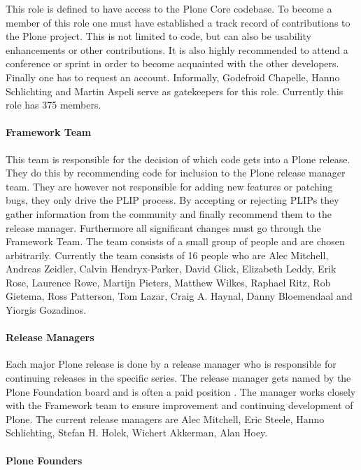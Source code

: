 This role is defined to have access to the Plone Core codebase. To become a
member of this role one must have established a track record of contributions
to the Plone project. This is not limited to code, but can also be usability
enhancements or other contributions. It is also highly recommended to attend a
conference or sprint in order to become acquainted with the other developers.
Finally one has to request an account. Informally, Godefroid Chapelle, Hanno
Schlichting and Martin Aspeli serve as gatekeepers for this role. Currently
this role has 375 members.

\paragraph{Framework Team}

This team is responsible for the decision of which code gets into a Plone
release. They do this by recommending code for inclusion to the Plone release
manager team. They are however not responsible for adding new features or
patching bugs, they only drive the \ac{PLIP} process. By accepting or rejecting
\acp{PLIP} they gather information from the community and finally recommend
them to the release manager. Furthermore all significant changes must go
through the Framework Team. The team consists of a small group of people and
are chosen arbitrarily. Currently the team consists of 16 people who are Alec
Mitchell, Andreas Zeidler, Calvin Hendryx-Parker, David Glick, Elizabeth Leddy,
Erik Rose, Laurence Rowe, Martijn Pieters, Matthew Wilkes, Raphael Ritz, Rob
Gietema, Ross Patterson, Tom Lazar, Craig A. Haynal, Danny Bloemendaal and
Yiorgis Gozadinos.

\paragraph{Release Managers}

Each major Plone release is done by a release manager who is responsible for
continuing releases in the specific series. The release manager gets named by
the Plone Foundation board and is often a paid position
\cite{PlonePaidReleaseManager}. The manager works closely with the Framework
team to ensure improvement and continuing development of Plone. The current
release managers are Alec Mitchell, Eric Steele, Hanno Schlichting, Stefan H.
Holek, Wichert Akkerman, Alan Hoey.

\paragraph{Plone Founders}

